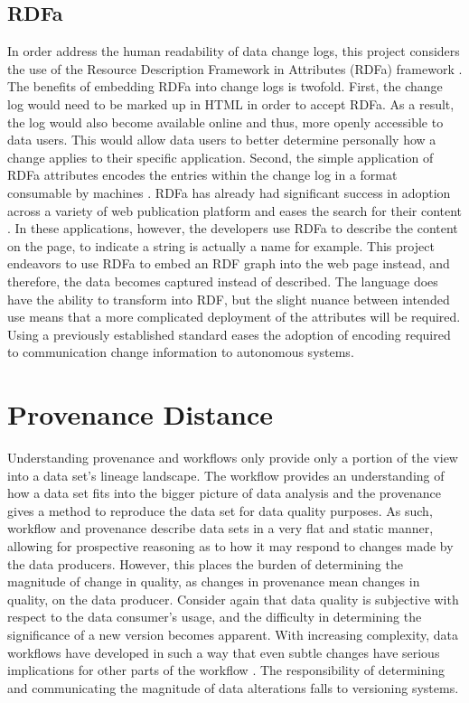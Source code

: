 \subsection{RDFa}

In order address the human readability of data change logs, this project considers the use of the Resource Description Framework in Attributes (RDFa) framework \cite{Adida2015}.
The benefits of embedding RDFa into change logs is twofold.
First, the change log would need to be marked up in HTML in order to accept RDFa.
As a result, the log would also become available online and thus, more openly accessible to data users.
This would allow data users to better determine personally how a change applies to their specific application.
Second, the simple application of RDFa attributes encodes the entries within the change log in a format consumable by machines \cite{Herman2015}.
RDFa has already had significant success in adoption across a variety of web publication platform and eases the search for their content \cite{Bizer2013}.
In these applications, however, the developers use RDFa to describe the content on the page, to indicate a string is actually a name for example.
This project endeavors to use RDFa to embed an RDF graph into the web page instead, and therefore, the data becomes captured instead of described.
The language does have the ability to transform into RDF, but the slight nuance between intended use means that a more complicated deployment of the attributes will be required.
Using a previously established standard eases the adoption of encoding required to communication change information to autonomous systems.

\section{Provenance Distance}

Understanding provenance and workflows only provide only a portion of the view into a data set's lineage landscape.
The workflow provides an understanding of how a data set fits into the bigger picture of data analysis and the provenance gives a method to reproduce the data set for data quality purposes.
As such, workflow and provenance describe data sets in a very flat and static manner, allowing for prospective reasoning as to how it may respond to changes made by the data producers.
However, this places the burden of determining the magnitude of change in quality, as changes in provenance mean changes in quality, on the data producer.
Consider again that data quality is subjective with respect to the data consumer's usage, and the difficulty in determining the significance of a new version becomes apparent.
With increasing complexity, data workflows have developed in such a way that even subtle changes have serious implications for other parts of the workflow \cite{TILMES2011548}.
The responsibility of determining and communicating the magnitude of data alterations falls to versioning systems.

